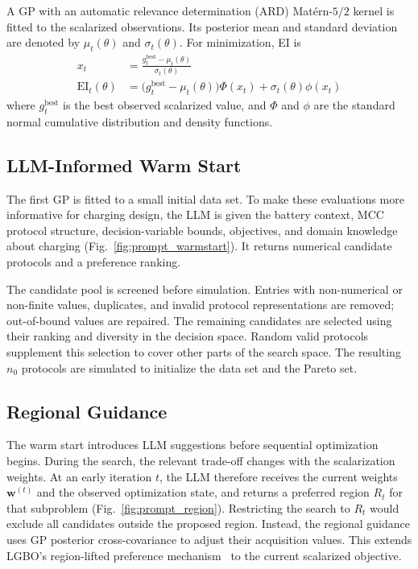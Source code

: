 \documentclass[journal,10pt]{IEEEtran}
\begin{document}
A GP with an automatic relevance determination (ARD) Mat\'ern-$5/2$ kernel is
fitted to the scalarized observations. Its posterior mean and standard
deviation are denoted by $\mu_t(\theta)$ and $\sigma_t(\theta)$. For
minimization, EI is
\begin{align}
 x_t&=\frac{g_t^{\mathrm{best}}-\mu_t(\theta)}{\sigma_t(\theta)}\\
 \mathrm{EI}_t(\theta)
 &=\bigl(g_t^{\mathrm{best}}-\mu_t(\theta)\bigr)\Phi(x_t)
 +\sigma_t(\theta)\phi(x_t)
 \label{eq:ei}
\end{align}
where $g_t^{\mathrm{best}}$ is the best observed scalarized value, and
$\Phi$ and $\phi$ are the standard normal cumulative distribution and density
functions.

\subsection{LLM-Informed Warm Start}
\label{sec:warm_start}

The first GP is fitted to a small initial data set. To make these evaluations
more informative for charging design, the LLM is given the battery context,
MCC protocol structure, decision-variable bounds, objectives, and domain
knowledge about charging (Fig.~\ref{fig:prompt_warmstart}). It returns
numerical candidate protocols and a preference ranking.

The candidate pool is screened before simulation. Entries with non-numerical
or non-finite values, duplicates, and invalid protocol representations are
removed; out-of-bound values are repaired. The remaining candidates are
selected using their ranking and diversity in the decision space. Random
valid protocols supplement this selection to cover other parts of the search
space. The resulting $n_0$ protocols are simulated to initialize the data
set and the Pareto set.

\subsection{Regional Guidance}
\label{sec:region_pref}

The warm start introduces LLM suggestions before sequential
optimization begins. During the search, the relevant trade-off changes with
the scalarization weights. At an early iteration $t$, the LLM therefore receives the current
weights $\mathbf w^{(t)}$ and the observed optimization state, and returns a
preferred region $R_t$ for that subproblem
(Fig.~\ref{fig:prompt_region}). Restricting the search to $R_t$
would exclude all candidates outside the proposed region. Instead, the regional
guidance uses GP posterior cross-covariance to adjust their acquisition values. This
extends LGBO's region-lifted preference mechanism~\cite{ref5} to the current
scalarized objective.
\end{document}
